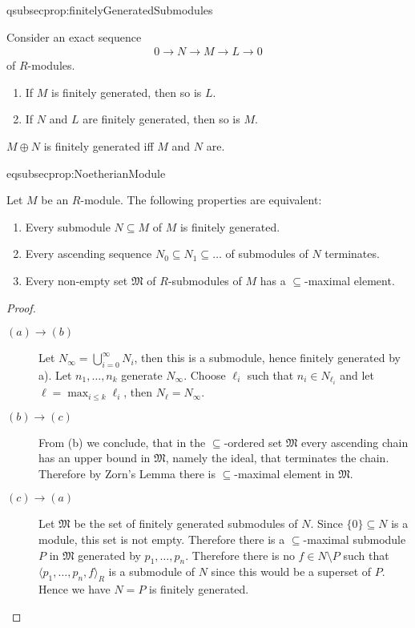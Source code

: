 \documentclass[DIV=14,parskip=full,pointednumbers]{scrartcl}
\newenvironment{alphanumerate}{\begin{enumerate}[label={\upshape(\alph*)},ref=\curthm]}{\end{enumerate}}
\newenvironment{rmnumerate}{\begin{enumerate}[label={\upshape(\roman*)},ref=\curthm]}{\end{enumerate}}
\theoremstyle{cthm}
\theoremstyle{cvarthm}
\theoremstyle{cdef}
\newcommand{\lbl}[1]{
	\label{#1}
	\ifmmode
	\expandafter\xdef\csname eqsubsec#1\endcsname{\thesubsection}
	\fi
}
\newcommand{\longto}{\longrightarrow}
\begin{document}
	\begin{prop} \lbl{prop:finitelyGeneratedSubmodules}
		Consider an exact sequence
		\begin{align*}
		0\longto N\longto M\longto L\longto 0
		\end{align*}
		of $R$-modules.
		\begin{rmnumerate}
			\item If $M$ is finitely generated, then so is $L$.
			\item If $N$ and $L$ are finitely generated, then so is $M$.
		\end{rmnumerate}
	\end{prop}
	
	\begin{cor}
		$M\oplus N$ is finitely generated iff $M$ and $N$ are. 
	\end{cor}
	\begin{prop}\lbl{prop:NoetherianModule}
		Let $M$ be an $R$-module. The following properties are equivalent:
		\begin{alphanumerate}
			\item Every submodule $N\subseteq M$ of $M$ is finitely generated.
			\item Every ascending sequence $N_0\subseteq N_1\subseteq \ldots$ of submodules of $N$ terminates.
			\item Every non-empty set $\mathfrak{M}$ of $R$-submodules of $M$ has a $\subseteq$-maximal element.
		\end{alphanumerate}
	\end{prop}
	\begin{proof}
		\begin{description}
			\item [$(a)\to(b)$] Let $N_\infty = \bigcup_{i=0}^\infty N_i$, then this is a submodule, hence finitely generated by a). Let $n_1,\ldots, n_k$ generate $N_\infty$. Choose $\ell_i$ such that $n_i\in N_{\ell_i}$ and let $\ell = \max_{i\leq k}\ell_i$, then $N_\ell = N_\infty$.
			\item [$(b)\to (c)$] From (b) we conclude, that in the $\subseteq$-ordered set $\mathfrak{M}$ every ascending chain has an upper bound in $\mathfrak{M}$, namely the ideal, that terminates the chain. Therefore by Zorn's Lemma there is $\subseteq$-maximal element in $\mathfrak{M}$.
			\item[$(c)\to (a)$] Let $\mathfrak{M}$ be the set of finitely generated submodules of $N$. Since $\{0\}\subseteq N$ is a module, this set is not empty. Therefore there is a $\subseteq$-maximal submodule $P$ in $\mathfrak{M}$ generated by $p_1,\ldots, p_n$. Therefore there is no $f\in N\setminus P$ such that $\langle p_1,\ldots, p_n, f\rangle_R$ is a submodule of $N$ since this would be a superset of $P$. Hence we have $N=P$ is finitely generated.
		\end{description}
	\end{proof}
	
\end{document}
